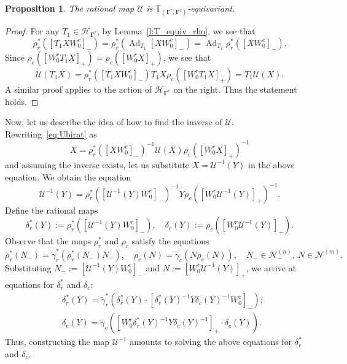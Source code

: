 \documentclass[11pt]{article}
\newcommand{\bg}{\mathbf{\Gamma}}
\DeclareMathOperator{\Ad}{Ad}
\newtheorem{proposition}[theorem]{Proposition}%
\theoremstyle{definition}\newtheorem{definition}[theorem]{Definition}
\theoremstyle{definition}\newtheorem{remark}[theorem]{Remark}
\theoremstyle{remark}
\numberwithin{equation}{section}
\begin{document}
\begin{proposition}\label{p:Tequivar}
    The rational map $\mathcal{U}$ is $\mathbb{T}_{(\bg^r,\bg^c)}$-equivariant.
\end{proposition}
\begin{proof}
    For any $T_1 \in \mathcal{H}_{\bg^r}$, by Lemma~\ref{l:T_equiv_rho}, we see that
    \begin{equation*}
        \rho_r^*([T_1 X W_0^c]_-) = \rho_r^*(\Ad_{T_1} [XW_0^c]_-) = \Ad_{T_1}\rho_r^*([XW_0^c]_-).
    \end{equation*}
    Since $\rho_c([W_0^r T_1X]_+) = \rho_c([W_0^rX]_+)$, we see that
    \begin{equation*}
        \mathcal{U}(T_1X) = \rho_r^*([T_1XW_0^c]_-) T_1 X \rho_c([W_0^rT_1X]_+) = T_1 \mathcal{U}(X).
    \end{equation*}
    A similar proof applies to the action of $\mathcal{H}_{\bg^c}$ on the right. Thus the statement holds.
\end{proof}

Now, let us describe the idea of how to find the inverse of $\mathcal{U}$. Rewriting~\eqref{eq:Ubirat} as
\begin{equation*}
    X = \rho_r^*([XW_0^c]_-)^{-1} \mathcal{U}(X) \rho_c([W_0^rX]_+)^{-1}
\end{equation*}
and assuming the inverse exists, let us substitute $X = \mathcal{U}^{-1}(Y)$ in the above equation. We obtain the equation
\begin{equation*}
    \mathcal{U}^{-1}(Y) = \rho_r^*([\mathcal{U}^{-1}(Y)W_0^c]_-)^{-1} Y \rho_c([W_0^r \mathcal{U}^{-1}(Y)]_+)^{-1}.
\end{equation*}
Define the rational maps
\begin{equation*}
    \delta_r^*(Y) := \rho_r^*([\mathcal{U}^{-1}(Y)W_0^c]_-), \quad \delta_c(Y):=\rho_c([W_0^r \mathcal{U}^{-1}(Y)]_+).
\end{equation*}
Observe that the maps $\rho_r^*$ and $\rho_c$ satisfy the equations
\begin{equation*}
    \rho_r^*(N_-) = \tilde{\gamma}_r^*(\rho_r^*(N_-)N_-), \quad \rho_c(N) = \tilde{\gamma}_c(N \rho_c(N)), \quad N_- \in \mathcal{N}^{(n)}_-, \ N \in \mathcal{N}^{(m)}.
\end{equation*}
Substituting $N_- := [\mathcal{U}^{-1}(Y)W_0^c]_-$ and $N:= [W_0^r\mathcal{U}^{-1}(Y)]_+$, we arrive at equations for $\delta_r^*$ and $\delta_c$:
\begin{align}
    &\delta_r^*(Y) = \tilde{\gamma}_r^*(\delta_r^*(Y)\cdot[\delta_r^*(Y)^{-1}Y\delta_c(Y)^{-1}W_0^c]_-);\label{eq:deltas_r} \\
    &\delta_c(Y) = \tilde{\gamma}_c([W_0^r \delta_r^*(Y)^{-1}Y\delta_c(Y)^{-1}]_+\cdot \delta_c(Y)). \label{eq:delta_c}
\end{align}
Thus, constructing the map $\mathcal{U}^{-1}$ amounts to solving the above equations for $\delta_r^*$ and $\delta_c$. 
\end{document}
